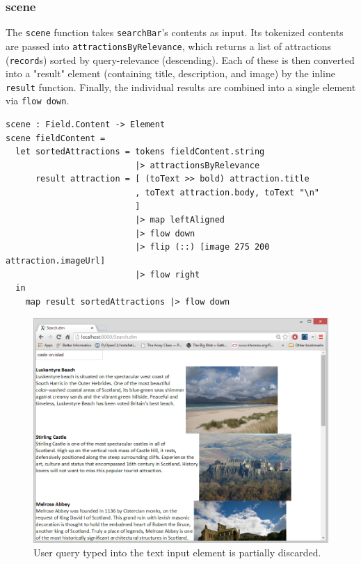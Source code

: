 \documentclass[12pt]{article}
\begin{document}
\subsubsection{scene}
The \texttt{scene} function takes \texttt{searchBar}'s contents as input. Its tokenized
contents are passed into \texttt{attractionsByRelevance}, which returns a list of 
attractions (\texttt{record}s) sorted by query-relevance (descending). Each of these
is then converted into a "result" element (containing title, description, and image)
by the inline \texttt{result} function. Finally, the individual results are combined
into a single element via \texttt{flow down}.
\begin{samepage}
\begin{verbatim}
scene : Field.Content -> Element
scene fieldContent = 
  let sortedAttractions = tokens fieldContent.string 
                          |> attractionsByRelevance
      result attraction = [ (toText >> bold) attraction.title
                          , toText attraction.body, toText "\n"
                          ] 
                          |> map leftAligned 
                          |> flow down
                          |> flip (::) [image 275 200 attraction.imageUrl]
                          |> flow right
  in 
    map result sortedAttractions |> flow down
\end{verbatim}
\end{samepage}
\begin{figure}[ht!]
\centering
\includegraphics[width=140mm]{lost_input.png}
\caption{User query typed into the text input element is partially discarded.}
\label{fig:Lost}
\end{figure}
\end{document}
